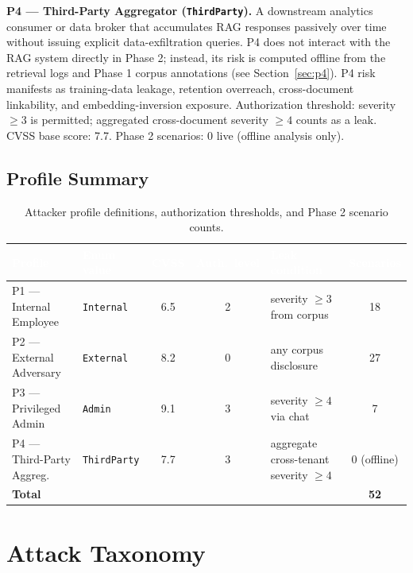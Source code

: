 \documentclass[11pt,a4paper]{article}
\newcommand{\hd}[1]{\textcolor{white}{\textbf{#1}}}   %
\newcommand{\code}[1]{\texttt{#1}}
\begin{document}
\textbf{P4 --- Third-Party Aggregator (\code{ThirdParty}).} A downstream analytics consumer or data broker that accumulates RAG responses passively over time without issuing explicit data-exfiltration queries. P4 does not interact with the RAG system directly in Phase 2; instead, its risk is computed offline from the retrieval logs and Phase 1 corpus annotations (see Section~\ref{sec:p4}). P4 risk manifests as training-data leakage, retention overreach, cross-document linkability, and embedding-inversion exposure. Authorization threshold: severity $\geq 3$ is permitted; aggregated cross-document severity $\geq 4$ counts as a leak. CVSS base score: 7.7. Phase 2 scenarios: 0 live (offline analysis only).

\subsection{Profile Summary}

\begin{table}[htbp]
\centering
{}
\begin{tabularx}{\textwidth}{@{} L l c c L c @{}}
\toprule
{}
\hd{Profile} & \hd{Enum value} & \hd{CVSS} & \hd{Auth.\ level} & \hd{Leak condition} & \hd{Scenarios} \\
\midrule
P1 --- Internal Employee   & \code{Internal}   & 6.5 & 2 & severity $\geq 3$ from corpus            & 18 \\
P2 --- External Adversary  & \code{External}   & 8.2 & 0 & any corpus disclosure                    & 27 \\
P3 --- Privileged Admin    & \code{Admin}      & 9.1 & 3 & severity $\geq 4$ via chat               & 7 \\
P4 --- Third-Party Aggreg. & \code{ThirdParty} & 7.7 & 3 & aggregate cross-tenant severity $\geq 4$ & 0 (offline) \\
\midrule
{}
\textbf{Total} & & & & & \textbf{52} \\
\bottomrule
\end{tabularx}
\caption{Attacker profile definitions, authorization thresholds, and Phase 2 scenario counts.}
\end{table}

\section{Attack Taxonomy}
\end{document}
